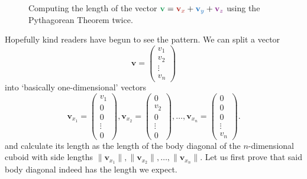 \begin{figure}[ht]
 \centering
 \caption{Computing the length of the vector $\clg{\mathbf{v}} =
  \clr{\mathbf{v}_x} + \clb{\mathbf{v}_y} + \clm{\mathbf{v}_z}$ using the
  Pythagorean Theorem twice.}
 \label{fig:vector-pythagoras-3d}
\end{figure}

Hopefully kind readers have begun to see the pattern. We can split a vector
\[
 \mathbf{v} =
 \begin{pmatrix}
  v_1\\
  v_2\\
  \vdots\\
  v_n
 \end{pmatrix}
\]
into `basically one-dimensional' vectors
\[
 \mathbf{v}_{x_1} =
 \begin{pmatrix}
  v_1\\
  0\\
  0\\
  \vdots\\
  0
 \end{pmatrix},
 \mathbf{v}_{x_2} = 
 \begin{pmatrix}
  0\\
  v_2\\
  0\\
  \vdots\\
  0
 \end{pmatrix},\ldots,
 \mathbf{v}_{x_n} = 
 \begin{pmatrix}
  0\\
  0\\
  0\\
  \vdots\\
  v_n
 \end{pmatrix}.
\]
and calculate its length as the length of the body diagonal of the
$n$-dimensional cuboid with side lengths $\|\mathbf{v}_{x_1}\|,
\|\mathbf{v}_{x_2}\|, \ldots, \|\mathbf{v}_{x_n}\|$. Let us first prove that
said body diagonal indeed has the length we expect.

